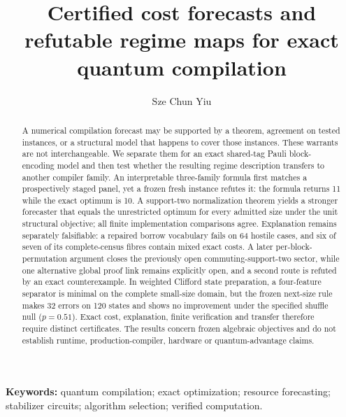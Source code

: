 \documentclass[a4paper,twocolumn,11pt,unpublished]{quantumarticle}
\theoremstyle{definition}
\begin{document}
\title{Certified cost forecasts and refutable regime maps for exact quantum compilation}
\author{Sze Chun Yiu}
\maketitle

\begin{abstract}
A numerical compilation forecast may be supported by a theorem, agreement on tested instances, or a structural model that happens to cover those instances.  These warrants are not interchangeable.  We separate them for an exact shared-tag Pauli block-encoding model and then test whether the resulting regime description transfers to another compiler family.  An interpretable three-family formula first matches a prospectively staged panel, yet a frozen fresh instance refutes it: the formula returns 11 while the exact optimum is 10.  A support-two normalization theorem yields a stronger forecaster that equals the unrestricted optimum for every admitted size under the unit structural objective; all finite implementation comparisons agree.  Explanation remains separately falsifiable: a repaired borrow vocabulary fails on 64 hostile cases, and six of seven of its complete-census fibres contain mixed exact costs.  A later per-block-permutation argument closes the previously open commuting-support-two sector, while one alternative global proof link remains explicitly open, and a second route is refuted by an exact counterexample.  In weighted Clifford state preparation, a four-feature separator is minimal on the complete small-size domain, but the frozen next-size rule makes 32 errors on 120 states and shows no improvement under the specified shuffle null ($p=0.51$).  Exact cost, explanation, finite verification and transfer therefore require distinct certificates.  The results concern frozen algebraic objectives and do not establish runtime, production-compiler, hardware or quantum-advantage claims.
\end{abstract}

\noindent\textbf{Keywords:} quantum compilation; exact optimization; resource forecasting; stabilizer circuits; algorithm selection; verified computation.














\end{document}
